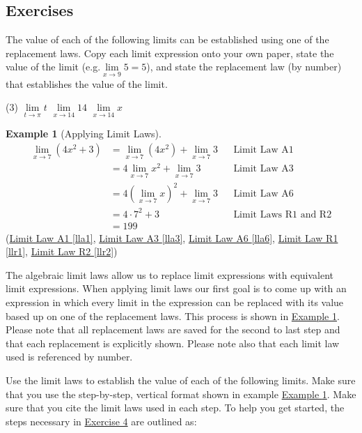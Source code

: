 \documentclass[12pt,]{book}
\theoremstyle{plain}
\theoremstyle{definition}
\newtheorem{example}[theorem]{Example}
\numberwithin{equation}{section}
\begin{document}
\subsection[Exercises]{Exercises}\label{exercises-6}
The value of each of the following limits can be established using one of the replacement laws. Copy each limit expression onto your own paper, state the value of the limit (e.g.\@ \(\lim\limits_{x\to9}5=5\)), and state the replacement law (by number) that establishes the value of the limit.%
\par
\begin{exercisegroup}(3)
\exercise[1.]\hypertarget{exercise-66}{\null}\(\lim\limits_{t\to\pi}t\)%
\exercise[2.]\hypertarget{exercise-67}{\null}\(\lim\limits_{x\to14}14\)%
\exercise[3.]\hypertarget{exercise-68}{\null}\(\lim\limits_{x\to14}x\)%
\end{exercisegroup}
\par\smallskip\noindent
\begin{example}[Applying Limit Laws]\label{example-apply-limit-laws}
\begin{align*}
\lim_{x\to7}\left(4x^2+3\right)&=\lim_{x\to7}\left(4x^2\right)+\lim_{x\to7}3&&\text{Limit Law A1}\\
&=4\lim_{x\to7}x^2+\lim_{x\to7}3&&\text{Limit Law A3}\\
&=4\left(\lim_{x\to7}x\right)^2+\lim_{x\to7}3&&\text{Limit Law A6}\\
&=4\cdot7^2+3&&\text{Limit Laws R1 and R2}\\
&=199
\end{align*}(\hyperref[lla1]{Limit Law A1 \ref{lla1}}, \hyperref[lla3]{Limit Law A3 \ref{lla3}}, \hyperref[lla6]{Limit Law A6 \ref{lla6}}, \hyperref[llr1]{Limit Law R1 \ref{llr1}}, \hyperref[llr2]{Limit Law R2 \ref{llr2}})%
\end{example}
The algebraic limit laws allow us to replace limit expressions with equivalent limit expressions. When applying limit laws our first goal is to come up with an expression in which every limit in the expression can be replaced with its value based up on one of the replacement laws. This process is shown in \hyperref[example-apply-limit-laws]{Example \ref{example-apply-limit-laws}}. Please note that all replacement laws are saved for the second to last step and that each replacement is explicitly shown. Please note also that each limit law used is referenced by number.%
\par
Use the limit laws to establish the value of each of the following limits. Make sure that you use the step-by-step, vertical format shown in example \hyperref[example-apply-limit-laws]{Example \ref{example-apply-limit-laws}}. Make sure that you cite the limit laws used in each step. To help you get started, the steps necessary in \hyperlink{exercise-first-apply-limit-laws}{Exercise 4} are outlined as:%
\end{document}
